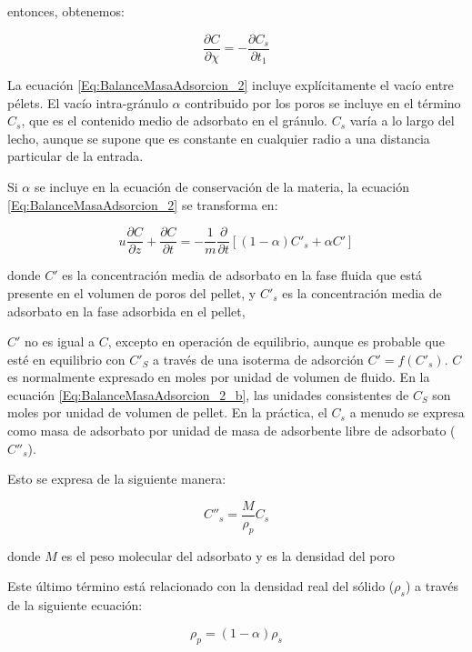 \documentclass[11pt]{book}
\begin{document}
entonces, obtenemos:

\begin{equation}
    \label{Eq:BalanceMasaAdsorcion_3}
    \frac{\partial C}{\partial \chi} = - \frac{\partial C_s}{\partial t_1}
\end{equation}

La ecuación \ref{Eq:BalanceMasaAdsorcion_2} incluye explícitamente el vacío entre pélets. El vacío intra-gránulo $\alpha$ contribuido por los poros se incluye en el término $C_s$, que es el contenido medio de adsorbato en el gránulo. $C_s$ varía a lo largo del lecho, aunque se supone que es constante en cualquier radio a una distancia particular de la entrada.

Si $\alpha$ se incluye en la ecuación de conservación de la materia, la ecuación \ref{Eq:BalanceMasaAdsorcion_2} se transforma en:

\begin{equation}
    \label{Eq:BalanceMasaAdsorcion_4}
    u  \frac{\partial C}{\partial z} + \frac{\partial C}{\partial t} = - \frac{1}{m} \frac{\partial}{\partial t}  \left[ (1-\alpha) C'_s + \alpha C' \right]
\end{equation}

donde $C'$ es la concentración media de adsorbato en la fase fluida que está presente en el volumen de poros del pellet, y $C'_s$ es la concentración media de adsorbato en la fase adsorbida en el pellet,

$C'$ no es igual a $C$, excepto en operación de equilibrio, aunque es probable que esté en equilibrio con $C'_S$ a través de una isoterma de adsorción $C' = f(C'_s)$. $C$ es normalmente expresado en moles por unidad de volumen de fluido. En la ecuación \ref{Eq:BalanceMasaAdsorcion_2_b}, las unidades consistentes de $C_S$ son moles por unidad de volumen de pellet. En la práctica, el $C_s$ a menudo se expresa como masa de adsorbato por unidad de masa de adsorbente libre de adsorbato ($C''_s$).

Esto se expresa de la siguiente manera:

\begin{equation*}
    C''_s = \frac{M}{\rho_p} C_s
\end{equation*}

donde $M$ es el peso molecular del adsorbato y es la densidad del poro

Este último término está relacionado con la densidad real del sólido ($\rho_s$) a través de la siguiente ecuación:

\begin{equation*}
    \rho_p = (1-\alpha) \rho_s
\end{equation*}
\end{document}
